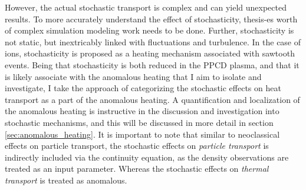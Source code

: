 \begin{refsection}
However, the actual stochastic transport is complex and can yield unexpected results. To more accurately understand the effect of stochasticity, thesis-es worth of complex simulation modeling work needs to be done. Further, stochasticity is not static, but inextricably linked with fluctuations and turbulence. In the case of ions, stochasticity is proposed as a heating mechanism associated with sawtooth events\cite{Fiksel2009}. Being that stochasticity is both reduced in the PPCD plasma, and that it is likely associate with the anomalous heating that I aim to isolate and investigate, I take the approach of categorizing the stochastic effects on heat transport as a part of the anomalous heating. A quantification and localization of the anomalous heating is instructive in the discussion and investigation into stochastic mechanisms, and this will be discussed in more detail in section \ref{sec:anomalous_heating}. It is important to note that similar to neoclassical effects on particle transport, the stochastic effects on \emph{particle transport} is indirectly included via the continuity equation, as the density observations are treated as an input parameter. Whereas the stochastic effects on \emph{thermal transport} is treated as anomalous.


%





\end{refsection}
